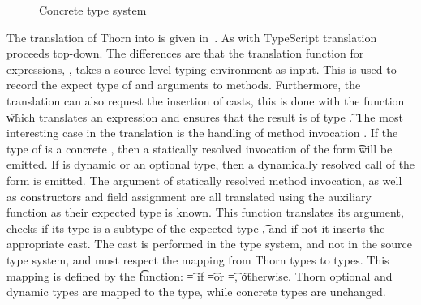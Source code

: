 \documentclass[runnningheads]{tex/llncs}
\begin{document}
\begin{figure}[hb]	
	
	\hrulefill  
	\vspace{0.5mm}
	
	\begin{mathpar}  
	\end{mathpar}
	
	\hrulefill
	\caption{Concrete type system}\label{thts2}
\end{figure}	

The translation of Thorn into \kafka is given in~. As with
TypeScript translation proceeds top-down. The differences are that the
translation function for expressions, \TRG{\e}\Env, takes a source-level
typing environment as input. This is used to record the expect type of \this
and arguments \x to methods. Furthermore, the translation can also request
the insertion of casts, this is done with the function \TAG{\e}\Env\t which
translates an expression and ensures that the result is of type \t. The most
interesting case in the translation is the handling of method invocation
\Call\e\m\ep. If the type of \e is a concrete \C, then a statically resolved
invocation of the form \KCall\e\m\ep\t\tp will be emitted. If \e is dynamic
or an optional type, then a dynamically resolved call of the form
\DynCall\e\m\ep is emitted.  The argument of statically resolved method
invocation, as well as constructors and field assignment are all translated
using the auxiliary function as their expected type is known.  This function
translates its argument, checks if its type is a subtype of the expected
type \t, and if not it inserts the appropriate cast.  The cast is performed
in the \kafka type system, and not in the source type system, and must
respect the mapping from Thorn types to \kafka types.  This mapping is
defined by the \kty\t function: \kty\t = \any if \t=\dt\C or \t=\any, \t
otherwise.  Thorn optional and dynamic types are mapped to the \any type,
while concrete types are unchanged.
\end{document}
